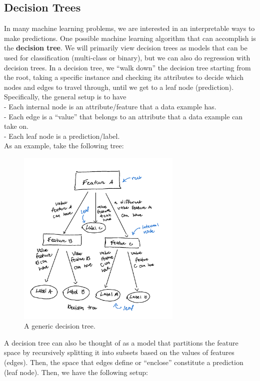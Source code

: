 \documentclass[11 pt]{scrartcl}
\begin{document}
\subsection{Decision Trees}
In many machine learning problems, we are interested in an interpretable ways to make predictions. One possible machine learning algorithm that can accomplish is the \textbf{decision tree}. We will primarily view decision trees as models that can be used for classification (multi-class or binary), but we can also do regression with decision trees. In a decision tree, we ``walk down'' the  decision tree starting from the root, taking a specific instance and checking its attributes to decide which nodes and edges to travel through, until we get to a leaf node (prediction). Specifically, the general setup is to have \\
- Each internal node is an attribute/feature that a data example has. \\
- Each edge is a ``value'' that belongs to an attribute that a data example can take on. \\
- Each leaf node is a prediction/label. \\
As an example, take the following tree: 
\begin{figure}[h!]
    \centering
    \includegraphics[width=0.7\textwidth]{images/decisiontree.png} %
    \caption{A generic decision tree.}
    \label{fig:q1_image}
\end{figure}
A decision tree can also be thought of as a model that partitions the feature space by recursively splitting it into subsets based on the values of features (edges). Then, the space that edges define or ``enclose'' constitute a prediction (leaf node). Then, we have the following setup: \\
\end{document}
